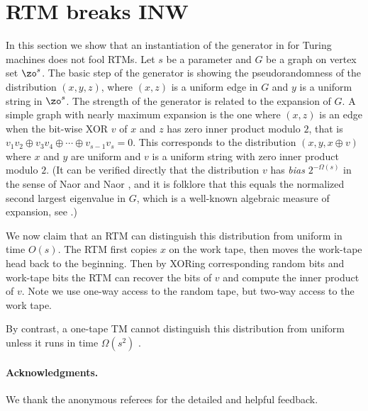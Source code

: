 \section{RTM breaks INW \label{sec:RTM-breaks-INW}}

In this section we show that an instantiation of the generator in
\cite{INW94} for Turing machines does not fool RTMs. Let $s$ be
a parameter and $G$ be a graph on vertex set $\zo^{s}$. The basic
step of the \cite{INW94} generator is showing the pseudorandomness
of the distribution $(x,y,z)$, where $(x,z)$ is a uniform edge in
$G$ and $y$ is a uniform string in $\zo^{s}$. The strength of the
generator is related to the expansion of $G$. A simple graph with
nearly maximum expansion is the one where $(x,z)$ is an edge when
the bit-wise XOR $v$ of $x$ and $z$ has zero inner product modulo
$2$, that is $v_{1}v_{2}\oplus v_{3}v_{4}\oplus\cdots\oplus v_{s-1}v_{s}=0$.
This corresponds to the distribution $(x,y,x\oplus v)$ where $x$
and $y$ are uniform and $v$ is a uniform string with zero inner
product modulo $2$. (It can be verified directly that the distribution
$v$ has \emph{bias} $2^{-\Omega(s)}$ in the sense of Naor and Naor
\cite{NaN93}, and it is folklore that this equals the normalized
second largest eigenvalue in $G$, which is a well-known algebraic
measure of expansion, see \cite{HooryLW06}.)

We now claim that an RTM can distinguish this distribution from uniform
in time $O(s)$. The RTM first copies $x$ on the work tape, then
moves the work-tape head back to the beginning. Then by XORing corresponding
random bits and work-tape bits the RTM can recover the bits of $v$
and compute the inner product of $v$. Note we use one-way access
to the random tape, but two-way access to the work tape.

By contrast, a one-tape TM cannot distinguish this distribution from
uniform unless it runs in time $\Omega(s^{2})$ \cite{INW94}.

\paragraph{Acknowledgments.}

We thank the anonymous referees for the detailed and helpful feedback.
